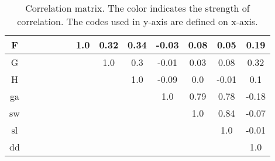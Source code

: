 \begin{table}[ht]
{\begin{tabular}{c c c c c c c c c c c c c}
F &  &  &  &  &  & \textcolor{cor-very-strong}{1.0} & \textcolor{cor-weak}{0.32} & \textcolor{cor-weak}{0.34} & \textcolor{cor-very-weak}{-0.03} & \textcolor{cor-very-weak}{0.08} & \textcolor{cor-very-weak}{0.05} & \textcolor{cor-very-weak}{0.19}\\ \hline
G &  &  &  &  &  &  & \textcolor{cor-very-strong}{1.0} & \textcolor{cor-weak}{0.3} & \textcolor{cor-very-weak}{-0.01} & \textcolor{cor-very-weak}{0.03} & \textcolor{cor-very-weak}{0.08} & \textcolor{cor-weak}{0.32}\\ \hline
H &  &  &  &  &  &  &  & \textcolor{cor-very-strong}{1.0} & \textcolor{cor-very-weak}{-0.09} & \textcolor{cor-very-weak}{0.0} & \textcolor{cor-very-weak}{-0.01} & \textcolor{cor-very-weak}{0.1}\\ \hline
ga &  &  &  &  &  &  &  &  & \textcolor{cor-very-strong}{1.0} & \textcolor{cor-strong}{0.79} & \textcolor{cor-strong}{0.78} & \textcolor{cor-very-weak}{-0.18}\\ \hline
sw &  &  &  &  &  &  &  &  &  & \textcolor{cor-very-strong}{1.0} & \textcolor{cor-very-strong}{0.84} & \textcolor{cor-very-weak}{-0.07}\\ \hline
sl &  &  &  &  &  &  &  &  &  &  & \textcolor{cor-very-strong}{1.0} & \textcolor{cor-very-weak}{-0.01}\\ \hline
dd &  &  &  &  &  &  &  &  &  &  &  & \textcolor{cor-very-strong}{1.0}\\ \hline

\end{tabular}
}

\caption{Correlation matrix. The color indicates the strength of correlation. The codes used in y-axis are defined on x-axis.}
\label{tab:correlationMatrix}
\end{table}
